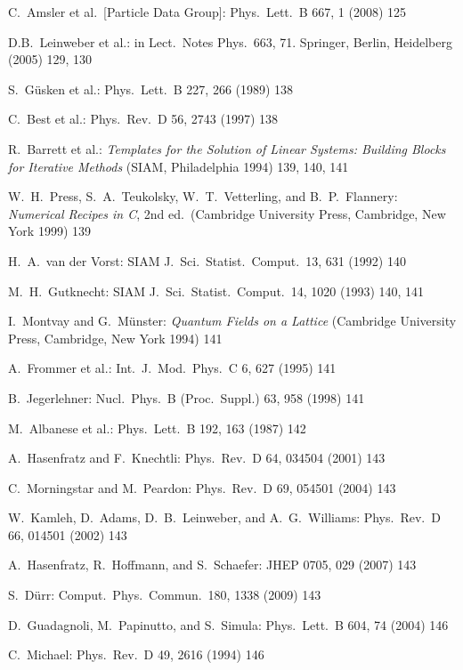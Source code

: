 \begin{enumerate}[label={[\arabic*]}]
  \item C.~Amsler et al.\ [Particle Data Group]: Phys.\ Lett.\ B 667, 1 (2008) 125
  \item D.B.~Leinweber et al.: in Lect.\ Notes Phys.\ 663, 71. Springer, Berlin,
        Heidelberg (2005) 129, 130
  \item S.~G\"usken et al.: Phys.\ Lett.\ B 227, 266 (1989) 138
  \item C.~Best et al.: Phys.\ Rev.\ D 56, 2743 (1997) 138
  \item R.~Barrett et al.: \emph{Templates for the Solution of Linear Systems:
        Building Blocks for Iterative Methods} (SIAM, Philadelphia 1994) 139,
        140, 141
  \item W.~H.~Press, S.~A.~Teukolsky, W.~T.~Vetterling, and B.~P.~Flannery:
        \emph{Numerical Recipes in C}, 2nd ed.\ (Cambridge University Press,
        Cambridge, New York 1999) 139
  \item H.~A.~van der Vorst: SIAM J.\ Sci.\ Statist.\ Comput.\ 13, 631 (1992)
        140
  \item M.~H.~Gutknecht: SIAM J.\ Sci.\ Statist.\ Comput.\ 14, 1020 (1993) 140,
        141
  \item I.~Montvay and G.~M\"unster: \emph{Quantum Fields on a Lattice}
        (Cambridge University Press, Cambridge, New York 1994) 141
  \item A.~Frommer et al.: Int.\ J.\ Mod.\ Phys.\ C 6, 627 (1995) 141
  \item B.~Jegerlehner: Nucl.\ Phys.\ B (Proc.\ Suppl.) 63, 958 (1998) 141
  \item M.~Albanese et al.: Phys.\ Lett.\ B 192, 163 (1987) 142
  \item A.~Hasenfratz and F.~Knechtli: Phys.\ Rev.\ D 64, 034504 (2001) 143
  \item C.~Morningstar and M.~Peardon: Phys.\ Rev.\ D 69, 054501 (2004) 143
  \item W.~Kamleh, D.~Adams, D.~B.~Leinweber, and A.~G.~Williams: Phys.\ Rev.\
        D 66, 014501 (2002) 143
  \item A.~Hasenfratz, R.~Hoffmann, and S.~Schaefer: JHEP 0705, 029 (2007) 143
  \item S.~D\"urr: Comput.\ Phys.\ Commun.\ 180, 1338 (2009) 143
  \item D.~Guadagnoli, M.~Papinutto, and S.~Simula: Phys.\ Lett.\ B 604, 74
        (2004) 146
  \item C.~Michael: Phys.\ Rev.\ D 49, 2616 (1994) 146

\end{enumerate}

